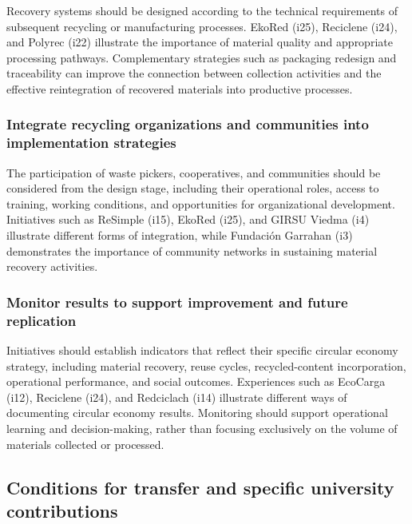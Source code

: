 \documentclass[
  12pt,
  oneside]{book}
\begin{document}
Recovery systems should be designed according to the technical
requirements of subsequent recycling or manufacturing processes. EkoRed
(i25), Reciclene (i24), and Polyrec (i22) illustrate the importance of
material quality and appropriate processing pathways. Complementary
strategies such as packaging redesign and traceability can improve the
connection between collection activities and the effective reintegration
of recovered materials into productive processes.

\subsubsection{Integrate recycling organizations and communities into
implementation
strategies}\label{integrate-recycling-organizations-and-communities-into-implementation-strategies}

The participation of waste pickers, cooperatives, and communities should
be considered from the design stage, including their operational roles,
access to training, working conditions, and opportunities for
organizational development. Initiatives such as ReSimple (i15), EkoRed
(i25), and GIRSU Viedma (i4) illustrate different forms of integration,
while Fundación Garrahan (i3) demonstrates the importance of community
networks in sustaining material recovery activities.

\subsubsection{Monitor results to support improvement and future
replication}\label{monitor-results-to-support-improvement-and-future-replication}

Initiatives should establish indicators that reflect their specific
circular economy strategy, including material recovery, reuse cycles,
recycled-content incorporation, operational performance, and social
outcomes. Experiences such as EcoCarga (i12), Reciclene (i24), and
Redciclach (i14) illustrate different ways of documenting circular
economy results. Monitoring should support operational learning and
decision-making, rather than focusing exclusively on the volume of
materials collected or processed.

\subsection{Conditions for transfer and specific university
contributions}\label{conditions-for-transfer-and-specific-university-contributions}
\end{document}

